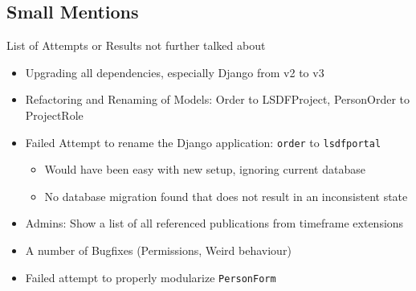 \subsection{Small Mentions}
\begin{frame}[c,fragile]{List of Attempts or Results not further talked about}
    \large
    \begin{itemize}[<+(1)->]
        \item Upgrading all dependencies, especially Django from v2 to v3
        \item Refactoring and Renaming of Models: Order to LSDFProject, PersonOrder to ProjectRole
        \item Failed Attempt to rename the Django application: \verb!order! to \verb!lsdfportal!
            \begin{itemize}[<+(1)->]
                \item Would have been easy with new setup, ignoring current database
                \item No database migration found that does not result in an inconsistent state
            \end{itemize}
        \item Admins: Show a list of all referenced publications from timeframe extensions
        \item A number of Bugfixes (Permissions, Weird behaviour)
        \item Failed attempt to properly modularize \texttt{PersonForm}
    \end{itemize}
\end{frame}



% 
